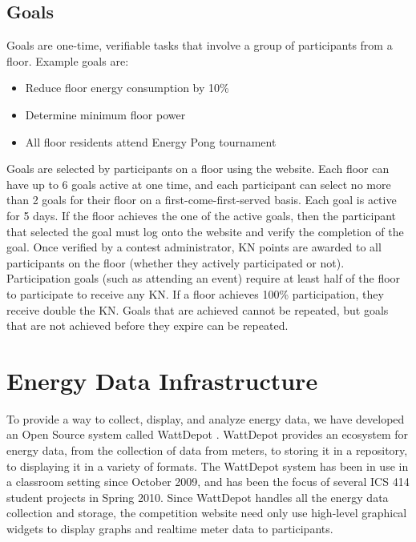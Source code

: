 \subsection{Goals}
\label{sec:goals}

Goals are one-time, verifiable tasks that involve a group of participants from a floor. Example goals are:

\begin{itemize}
	\item Reduce floor energy consumption by 10\%
	\item Determine minimum floor power
	\item All floor residents attend Energy Pong tournament
\end{itemize}

Goals are selected by participants on a floor using the website. Each floor can have up to 6 goals active at one time, and each participant can select no more than 2 goals for their floor on a first-come-first-served basis. Each goal is active for 5 days. If the floor achieves the one of the active goals, then the participant that selected the goal must log onto the website and verify the completion of the goal. Once verified by a contest administrator, KN points are awarded to all participants on the floor (whether they actively participated or not). Participation goals (such as attending an event) require at least half of the floor to participate to receive any KN. If a floor achieves 100\% participation, they receive double the KN. Goals that are achieved cannot be repeated, but goals that are not achieved before they expire can be repeated.


\section{Energy Data Infrastructure}

To provide a way to collect, display, and analyze energy data, we have developed an Open Source system called WattDepot \cite{WattDepot}. WattDepot provides an ecosystem for energy data, from the collection of data from meters, to storing it in a repository, to displaying it in a variety of formats. The WattDepot system has been in use in a classroom setting since October 2009, and has been the focus of several ICS 414 student projects in Spring 2010. Since WattDepot handles all the energy data collection and storage, the competition website need only use high-level graphical widgets to display graphs and realtime meter data to participants.


